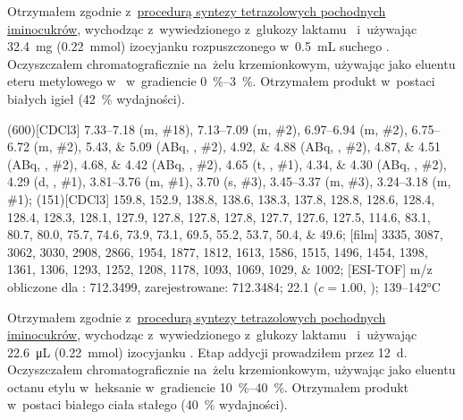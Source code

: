 Otrzymałem zgodnie z~\hyperref[experimental:sugars:schwartz]{procedurą syntezy tetrazolowych
	pochodnych iminocukrów}, wychodząc z~wywiedzionego z~glukozy laktamu~
	i~używając \SI{32.4}{\milli\gram} (\SI{0.22}{\milli\mol}) izocyjanku 
	rozpuszczonego w~\SI{0.5}{\milli\liter} suchego .
Oczyszczałem chromatograficznie na~żelu krzemionkowym,
	używając jako eluentu eteru  metylowego w~ w~gradiencie
	\SIrange{0}{3}{\percent}.
Otrzymałem produkt w~postaci białych igieł (\SI{42}{\percent} wydajności).

\begin{fullexp}
	\NMR(600)[CDCl3] \numrange{7.33}{7.18} (m, \#{18}), \numrange{7.13}{7.09} (m, \#{2}), \numrange{6.97}{6.94} (m, \#{2}), \numrange{6.75}{6.72} (m, \#{2}), \numlist{5.43;5.09} (ABq, , \#{2}), \numlist{4.92;4.88} (ABq, , \#{2}), \numlist{4.87;4.51} (ABq, , \#{2}), \numlist{4.68;4.42} (ABq, , \#{2}), \num{4.65} (t, , \#{1}), \numlist{4.34;4.30} (ABq, , \#{2}), \num{4.29} (d, , \#{1}), \numrange{3.81}{3.76} (m, \#{1}), \num{3.70} (s, \#{3}), \numrange{3.45}{3.37} (m, \#{3}), \numrange{3.24}{3.18} (m, \#{1});
	(151)[CDCl3] \numlist{159.8; 152.9; 138.8; 138.6; 138.3; 137.8; 128.8; 128.6; 128.4; 128.4; 128.3; 128.1; 127.9; 127.8; 127.8; 127.8; 127.7; 127.6; 127.5; 114.6; 83.1; 80.7; 80.0; 75.7; 74.6; 73.9; 73.1; 69.5; 55.2; 53.7; 50.4; 49.6};
	[film] \numlist{3335; 3087; 3062; 3030; 2908; 2866; 1954; 1877; 1812; 1613; 1586; 1515; 1496; 1454; 1398; 1361; 1306; 1293; 1252; 1208; 1178; 1093; 1069; 1029; 1002};
	[ESI-TOF] m/z obliczone dla : \num{712.3499}, zarejestrowane: \num{712.3484};
	\data{[$\alpha^{23}_D$]~$=$} \num{22.1} ($c = 1.00$, );
	 \numrange{139}{142}\si{\celsius}
\end{fullexp}

Otrzymałem zgodnie z~\hyperref[experimental:sugars:schwartz]{procedurą syntezy tetrazolowych
	pochodnych iminocukrów}, wychodząc z~wywiedzionego z~glukozy laktamu~
	i~używając \SI{22.6}{\micro\liter} (\SI{0.22}{\milli\mol}) izocyjanku .
Etap addycji prowadziłem przez \SI{12}{\day}.
Oczyszczałem chromatograficznie na~żelu krzemionkowym,
	używając jako eluentu octanu etylu w~heksanie w~gradiencie \SIrange{10}{40}{\percent}.
Otrzymałem produkt w~postaci białego ciała stałego (\SI{40}{\percent} wydajności).

